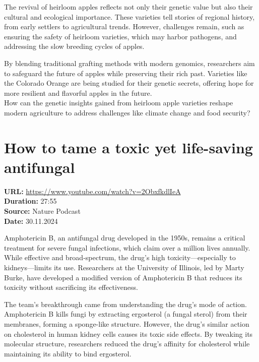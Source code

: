\documentclass[12pt]{article}
\begin{document}
The revival of heirloom apples reflects not only their genetic value but also their cultural and ecological importance. These varieties tell stories of regional history, from early settlers to agricultural trends. However, challenges remain, such as ensuring the safety of heirloom varieties, which may harbor pathogens, and addressing the slow breeding cycles of apples.  

By blending traditional grafting methods with modern genomics, researchers aim to safeguard the future of apples while preserving their rich past. Varieties like the Colorado Orange are being studied for their genetic secrets, offering hope for more resilient and flavorful apples in the future.\\[5px]  
 
How can the genetic insights gained from heirloom apple varieties reshape modern agriculture to address challenges like climate change and food security?  



\newpage

\section{How to tame a toxic yet life-saving antifungal}
\textbf{URL:} \url{https://www.youtube.com/watch?v=2ObxfkdlIeA}\\
\textbf{Duration:} 27:55\\
\textbf{Source:} Nature Podcast\\
\textbf{Date:} 30.11.2024

 

Amphotericin B, an antifungal drug developed in the 1950s, remains a critical treatment for severe fungal infections, which claim over a million lives annually. While effective and broad-spectrum, the drug's high toxicity—especially to kidneys—limits its use. Researchers at the University of Illinois, led by Marty Burke, have developed a modified version of Amphotericin B that reduces its toxicity without sacrificing its effectiveness.  

The team's breakthrough came from understanding the drug's mode of action. Amphotericin B kills fungi by extracting ergosterol (a fungal sterol) from their membranes, forming a sponge-like structure. However, the drug's similar action on cholesterol in human kidney cells causes its toxic side effects. By tweaking its molecular structure, researchers reduced the drug’s affinity for cholesterol while maintaining its ability to bind ergosterol.  
\end{document}
